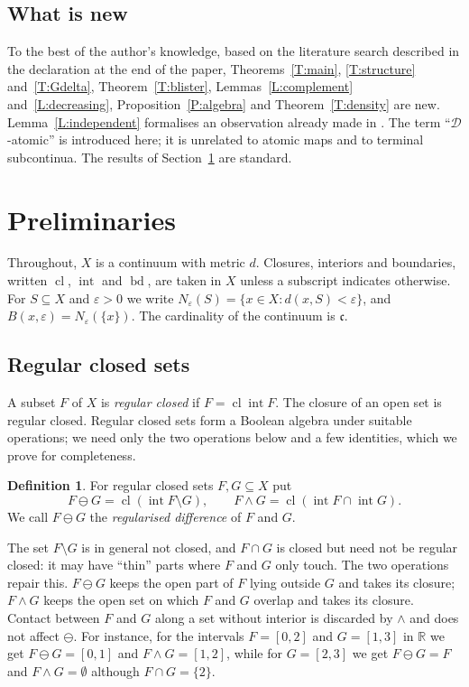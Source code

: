\documentclass[11pt,reqno]{amsart}
\theoremstyle{plain}
\theoremstyle{definition}
\newtheorem{definition}[theorem]{Definition}
\theoremstyle{remark}
\newcommand{\D}{\mathcal{D}}
\newcommand{\cl}{\operatorname{cl}}
\newcommand{\intr}{\operatorname{int}}
\newcommand{\bd}{\operatorname{bd}}
\newcommand{\R}{\mathbb{R}}
\newcommand{\cc}{\mathfrak{c}}
\newcommand{\rd}{\ominus}
\begin{document}
\subsection{What is new}
To the best of the author's knowledge, based on the literature search described in the declaration at the end of the paper, Theorems~\ref{T:main}, \ref{T:structure} and~\ref{T:Gdelta}, Theorem~\ref{T:blister}, Lemmas~\ref{L:complement} and~\ref{L:decreasing}, Proposition~\ref{P:algebra} and Theorem~\ref{T:density} are new. Lemma~\ref{L:independent} formalises an observation already made in \cite[Section~6]{AdAirr}. The term ``$\D$-atomic'' is introduced here; it is unrelated to atomic maps and to terminal subcontinua. The results of Section~\ref{S:prelim} are standard.

\section{Preliminaries}\label{S:prelim}

Throughout, $X$ is a continuum with metric $d$. Closures, interiors and boundaries, written $\cl$, $\intr$ and $\bd$, are taken in $X$ unless a subscript indicates otherwise. For $S\subseteq X$ and $\varepsilon>0$ we write $N_\varepsilon(S)=\{x\in X:d(x,S)<\varepsilon\}$, and $B(x,\varepsilon)=N_\varepsilon(\{x\})$. The cardinality of the continuum is $\cc$.

\subsection{Regular closed sets}
A subset $F$ of $X$ is \emph{regular closed} if $F=\cl\intr F$. The closure of an open set is regular closed. Regular closed sets form a Boolean algebra under suitable operations; we need only the two operations below and a few identities, which we prove for completeness.

\begin{definition}\label{D:ops}
For regular closed sets $F,G\subseteq X$ put
\[
F\rd G=\cl(\intr F\setminus G),\qquad F\wedge G=\cl(\intr F\cap\intr G).
\]
We call $F\rd G$ the \emph{regularised difference} of $F$ and $G$.
\end{definition}

The set $F\setminus G$ is in general not closed, and $F\cap G$ is closed but need not be regular closed: it may have ``thin'' parts where $F$ and $G$ only touch. The two operations repair this. $F\rd G$ keeps the open part of $F$ lying outside $G$ and takes its closure; $F\wedge G$ keeps the open set on which $F$ and $G$ overlap and takes its closure. Contact between $F$ and $G$ along a set without interior is discarded by $\wedge$ and does not affect $\rd$. For instance, for the intervals $F=[0,2]$ and $G=[1,3]$ in $\R$ we get $F\rd G=[0,1]$ and $F\wedge G=[1,2]$, while for $G=[2,3]$ we get $F\rd G=F$ and $F\wedge G=\emptyset$ although $F\cap G=\{2\}$.
\end{document}
